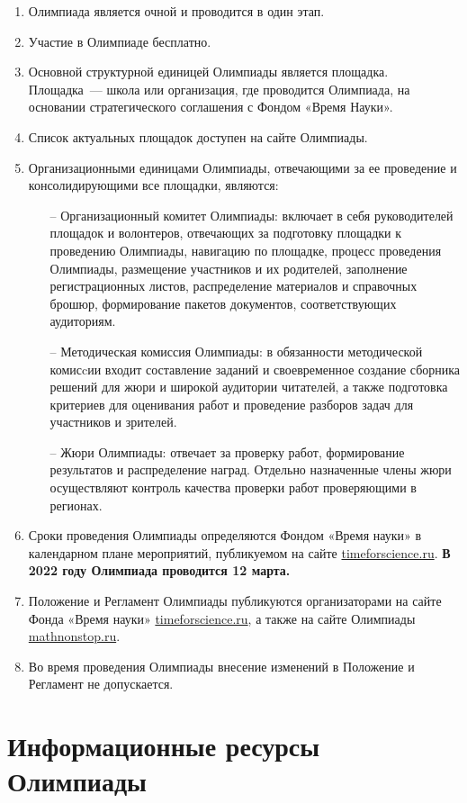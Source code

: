 \documentclass[a4paper,12pt]{article}
\newcommand{\surl}[1]{{\small\url{#1}}}
\begin{document}
\begin{enumerate}
	\item Олимпиада является очной и проводится в один этап.
	\item Участие в Олимпиаде бесплатно.
	\item Основной структурной единицей Олимпиады является площадка. Площадка~— школа или организация, где проводится Олимпиада, на основании стратегического соглашения с Фондом «Время Науки».
	\item Список актуальных площадок доступен на сайте Олимпиады.
	\item Организационными единицами Олимпиады, отвечающими за ее проведение и консолидирующими все площадки, являются: \begin{enumerate}
	   \item[–] Организационный комитет Олимпиады: включает в себя руководителей площадок и волонтеров, отвечающих за подготовку площадки к проведению Олимпиады, навигацию по площадке, процесс проведения Олимпиады, размещение участников и их родителей, заполнение регистрационных листов, распределение материалов и справочных брошюр, формирование пакетов документов, соответствующих аудиториям.
	   \item[–] Методическая комиссия Олимпиады: в обязанности методической комисcии входит составление заданий и своевременное создание сборника решений для жюри и широкой аудитории читателей, а также подготовка критериев для оценивания работ и проведение разборов задач для участников и зрителей.
	   \item[–] Жюри Олимпиады: отвечает за проверку работ, формирование результатов и распределение наград. Отдельно назначенные члены жюри осуществляют контроль качества проверки работ проверяющими в регионах.
   \end{enumerate}
	\item Сроки проведения Олимпиады определяются Фондом «Время науки» в календарном плане мероприятий, публикуемом на сайте \surl{timeforscience.ru}. {\bf В 2022 году Олимпиада проводится 12 марта.}
	\item Положение и Регламент Олимпиады публикуются организаторами на сайте Фонда «Время науки» \surl{timeforscience.ru}, а также на сайте Олимпиады \surl{mathnonstop.ru}.
	\item Во время проведения Олимпиады внесение изменений в Положение и Регламент не допускается.
\end{enumerate}

\section{Информационные ресурсы Олимпиады}
\end{document}
